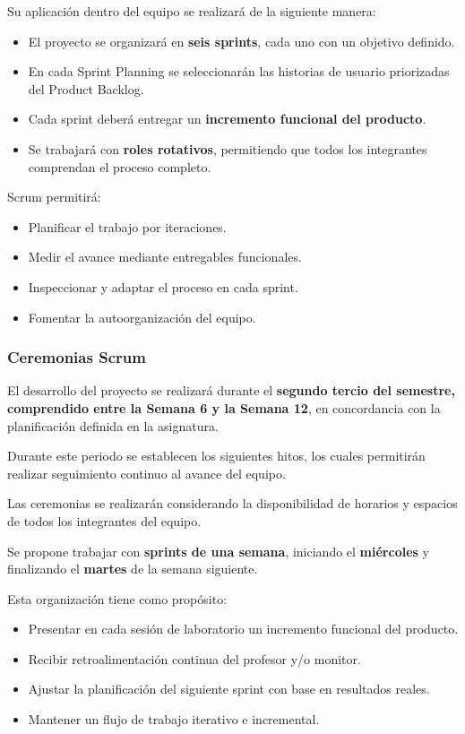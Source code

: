 \documentclass[12pt]{article}
\begin{document}
Su aplicación dentro del equipo se realizará de la siguiente manera:

\begin{itemize}
    \item El proyecto se organizará en \textbf{seis sprints}, cada uno con un objetivo definido.
    \item En cada Sprint Planning se seleccionarán las historias de usuario priorizadas del Product Backlog.
    \item Cada sprint deberá entregar un \textbf{incremento funcional del producto}.
    \item Se trabajará con \textbf{roles rotativos}, permitiendo que todos los integrantes comprendan el proceso completo.
\end{itemize}

Scrum permitirá:

\begin{itemize}
    \item Planificar el trabajo por iteraciones.
    \item Medir el avance mediante entregables funcionales.
    \item Inspeccionar y adaptar el proceso en cada sprint.
    \item Fomentar la autoorganización del equipo.
\end{itemize}

\subsubsection{Ceremonias Scrum}

El desarrollo del proyecto se realizará durante el \textbf{segundo tercio del semestre, comprendido entre la Semana 6 y la Semana 12}, en concordancia con la planificación definida en la asignatura.

Durante este periodo se establecen los siguientes hitos, los cuales permitirán realizar seguimiento continuo al avance del equipo.

Las ceremonias se realizarán considerando la disponibilidad de horarios y espacios de todos los integrantes del equipo.

Se propone trabajar con \textbf{sprints de una semana}, iniciando el \textbf{miércoles} y finalizando el \textbf{martes} de la semana siguiente.

Esta organización tiene como propósito:

\begin{itemize}
    \item Presentar en cada sesión de laboratorio un incremento funcional del producto.
    \item Recibir retroalimentación continua del profesor y/o monitor.
    \item Ajustar la planificación del siguiente sprint con base en resultados reales.
    \item Mantener un flujo de trabajo iterativo e incremental.
\end{itemize}
\end{document}
